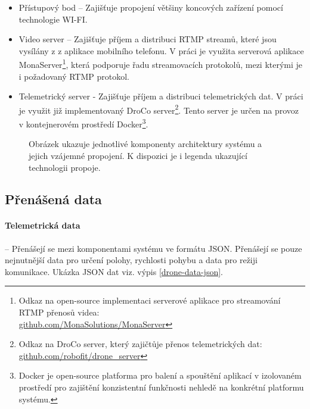 \begin{itemize}
    \item Přístupový bod -- Zajišťuje propojení většiny koncových zařízení pomocí technologie WI-FI.
    
    \item Video server -- Zajišťuje příjem a distribuci RTMP streamů, které jsou vysílány z z aplikace mobilního telefonu. V práci je využita serverová aplikace MonaServer\footnote{Odkaz na open-source implementaci serverové aplikace pro streamování RTMP přenosů videa: \\ \href{https://github.com/MonaSolutions/MonaServer}{github.com/MonaSolutions/MonaServer}}, která podporuje řadu streamovacích protokolů, mezi kterými je i požadovaný RTMP protokol.
   
    \item Telemetrický server - Zajišťuje příjem a distribuci telemetrických dat. V práci je využit již implementovaný DroCo server\footnote{Odkaz na DroCo server, který zajičtůje přenos telemetrických dat: \href{https://github.com/robofit/drone_server}{github.com/robofit/drone\_server}}. Tento server je určen na provoz v kontejnerovém prostředí Docker\footnote{Docker je open-source platforma pro balení a  spouštění aplikací v izolovaném prostředí pro zajištění konzistentní funkčnosti nehledě na konkrétní platformu systému.}.
\end{itemize}

\begin{figure}[ht]
    \centering
    
    \caption{Obrázek ukazuje jednotlivé komponenty architektury systému  a  jejich vzájemné propojení. K dispozici je i legenda ukazující technologii  propoje. }
    \label{pic:ekosystem}
\end{figure}

\subsection{Přenášená data}

\paragraph{Telemetrická data} -- Přenášejí se mezi komponentami systému ve formátu JSON. Přenášejí se pouze nejnutnější data pro určení polohy, rychlosti pohybu a data pro režiji komunikace. Ukázka JSON dat viz. výpis \ref{drone-data-json}.
